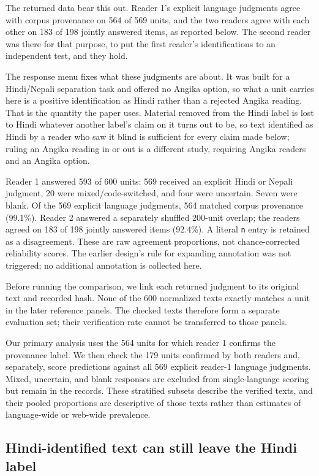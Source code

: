 \documentclass[final]{clv2025}
\newcommand{\lab}[1]{\texttt{#1}}
\begin{document}
The returned data bear this out. Reader 1's explicit language judgments agree with corpus provenance on 564 of 569 units, and the two readers agree with each other on 183 of 198 jointly answered items, as reported below. The second reader was there for that purpose, to put the first reader's identifications to an independent test, and they hold.

The response menu fixes what these judgments are about. It was built for a Hindi/Nepali separation task and offered no Angika option, so what a unit carries here is a positive identification as Hindi rather than a rejected Angika reading. That is the quantity the paper uses. Material removed from the Hindi label is lost to Hindi whatever another label's claim on it turns out to be, so text identified as Hindi by a reader who saw it blind is sufficient for every claim made below; ruling an Angika reading in or out is a different study, requiring Angika readers and an Angika option.

Reader 1 answered 593 of 600 units: 569 received an explicit Hindi or Nepali judgment, 20 were mixed/code-switched, and four were uncertain. Seven were blank. Of the 569 explicit language judgments, 564 matched corpus provenance (99.1\%). Reader 2 answered a separately shuffled 200-unit overlap; the readers agreed on 183 of 198 jointly answered items (92.4\%). A literal \lab{n} entry is retained as a disagreement. These are raw agreement proportions, not chance-corrected reliability scores. The earlier design's rule for expanding annotation was not triggered; no additional annotation is collected here.

Before running the comparison, we link each returned judgment to its original text and recorded hash. None of the 600 normalized texts exactly matches a unit in the later reference panels. The checked texts therefore form a separate evaluation set; their verification rate cannot be transferred to those panels.

Our primary analysis uses the 564 units for which reader 1 confirms the provenance label. We then check the 179 units confirmed by both readers and, separately, score predictions against all 569 explicit reader-1 language judgments. Mixed, uncertain, and blank responses are excluded from single-language scoring but remain in the records. These stratified subsets describe the verified texts, and their pooled proportions are descriptive of those texts rather than estimates of language-wide or web-wide prevalence.

\subsection{Hindi-identified text can still leave the Hindi label}
\end{document}
